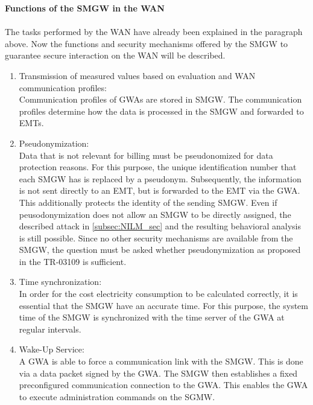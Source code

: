 \textbf{Functions of the SMGW in the WAN}
\\
\\
The tasks performed by the \gls{WAN} have already been explained in the paragraph above. Now the functions and security mechanisms offered by the \gls{SMGW} to guarantee secure interaction on the \gls{WAN} will be described.
\begin{enumerate}
\item Transmission of measured values based on evaluation and \gls{WAN} communication profiles:\\
Communication profiles of \gls{GWA}s are stored in \gls{SMGW}. The communication profiles determine how the data is processed in the \gls{SMGW} and forwarded to \gls{EMT}s.

\item Pseudonymization:\\
Data that is not relevant for billing must be pseudonomized for data protection reasons. For this purpose, the unique identification number that each \gls{SMGW} has is replaced by a pseudonym. Subsequently, the information is not sent directly to an \gls{EMT}, but is forwarded to the \gls{EMT} via the \gls{GWA}. This additionally protects the identity of the sending \gls{SMGW}.%
Even if peusodonymization does not allow an \gls{SMGW} to be directly assigned, the described attack in \ref{subsec:NILM_sec} and the resulting behavioral analysis is still possible. Since no other security mechanisms are available from the \gls{SMGW}, the question must be asked whether pseudonymization as proposed in the \gls{TR-03109} is sufficient.

\item Time synchronization:\\
In order for the cost electricity consumption to be calculated correctly, it is essential that the \gls{SMGW} have an accurate time. For this purpose, the system time of the \gls{SMGW} is synchronized with the time server of the \gls{GWA} at regular intervals.

\item Wake-Up Service:\\
A \gls{GWA} is able to force a communication link with the \gls{SMGW}. This is done via a data packet signed by the \gls{GWA}. The \gls{SMGW} then establishes a fixed preconfigured communication connection to the \gls{GWA}. This enables the \gls{GWA} to execute administration commands on the SGMW. 
\end{enumerate}
